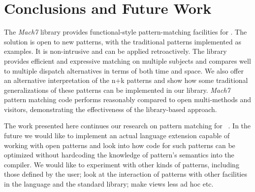 \section{Conclusions and Future Work} %
\label{sec:cc}

The \emph{Mach7} library provides functional-style 
pattern-matching facilities for \Cpp{}. The solution is open to new patterns, 
with the traditional patterns implemented as examples. It is
non-intrusive and can be applied retroactively. %
The library provides efficient and expressive matching on multiple subjects and 
compares well to multiple dispatch alternatives in terms of both time and space.
We also offer an alternative interpretation of the n+k patterns and show how some 
traditional generalizations of these patterns can be implemented in our library. 
%
%
%
\emph{Mach7} pattern matching code performs reasonably compared to
open multi-methods and visitors, demonstrating the effectiveness of the 
library-based approach.

The work presented here continues our research on pattern matching for 
\Cpp{}~\cite{TS12}. In the future we would like to implement an actual language 
extension capable of working with open patterns and look into how code for such 
patterns can be optimized without hardcoding the knowledge of pattern's 
semantics into the compiler. 
We would like to experiment with other kinds of patterns, 
including those defined by the user; look at the interaction of patterns with 
other facilities in the language and the standard library; make
views less ad hoc etc.

